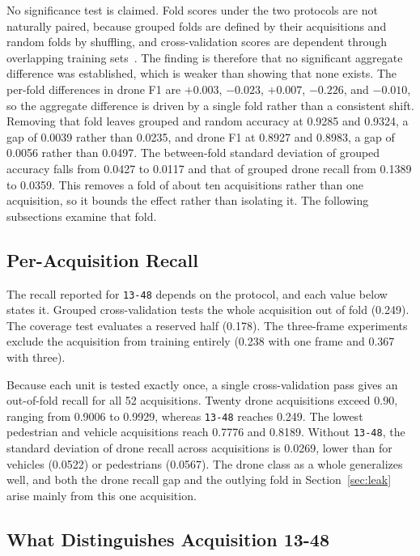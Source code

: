 \documentclass{ICIC2026}
\begin{document}
No significance test is claimed. Fold scores under the two protocols are not naturally paired, because grouped folds are defined by their acquisitions and random folds by shuffling, and cross-validation scores are dependent through overlapping training sets~\cite{dietterich1998,nadeau2003}. The finding is therefore that no significant aggregate difference was established, which is weaker than showing that none exists. The per-fold differences in drone F1 are $+0.003$, $-0.023$, $+0.007$, $-0.226$, and $-0.010$, so the aggregate difference is driven by a single fold rather than a consistent shift. Removing that fold leaves grouped and random accuracy at 0.9285 and 0.9324, a gap of 0.0039 rather than 0.0235, and drone F1 at 0.8927 and 0.8983, a gap of 0.0056 rather than 0.0497. The between-fold standard deviation of grouped accuracy falls from 0.0427 to 0.0117 and that of grouped drone recall from 0.1389 to 0.0359. This removes a fold of about ten acquisitions rather than one acquisition, so it bounds the effect rather than isolating it. The following subsections examine that fold.

\subsection{Per-Acquisition Recall}
\label{sec:regime}

The recall reported for \texttt{13-48} depends on the protocol, and each value below states it. Grouped cross-validation tests the whole acquisition out of fold (0.249). The coverage test evaluates a reserved half (0.178). The three-frame experiments exclude the acquisition from training entirely (0.238 with one frame and 0.367 with three).

Because each unit is tested exactly once, a single cross-validation pass gives an out-of-fold recall for all 52 acquisitions. Twenty drone acquisitions exceed 0.90, ranging from 0.9006 to 0.9929, whereas \texttt{13-48} reaches 0.249. The lowest pedestrian and vehicle acquisitions reach 0.7776 and 0.8189. Without \texttt{13-48}, the standard deviation of drone recall across acquisitions is 0.0269, lower than for vehicles (0.0522) or pedestrians (0.0567). The drone class as a whole generalizes well, and both the drone recall gap and the outlying fold in Section~\ref{sec:leak} arise mainly from this one acquisition.

\subsection{What Distinguishes Acquisition 13-48}
\label{sec:distinguish}
\end{document}
